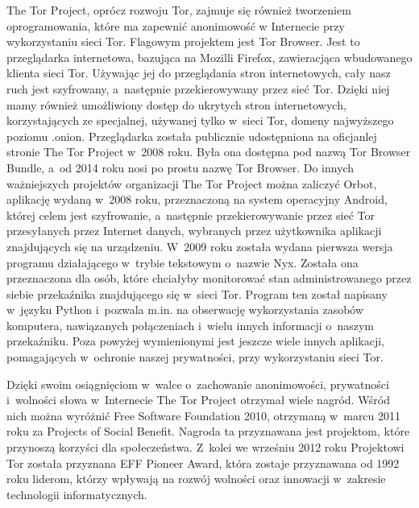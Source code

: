 The Tor Project, oprócz rozwoju Tor, zajmuje się również tworzeniem oprogramowania, które ma zapewnić anonimowość w Internecie przy wykorzystaniu sieci Tor. Flagowym projektem jest Tor Browser. Jest to przeglądarka internetowa, bazująca na Mozilli Firefox, zawieracjąca wbudowanego klienta sieci Tor. Używając jej do przeglądania stron internetowych, cały nasz ruch jest szyfrowany, a~następnie przekierowywany przez sieć Tor. Dzięki niej mamy również umożliwiony dostęp do ukrytych stron internetowych, korzystających ze specjalnej, używanej tylko w~sieci Tor, domeny najwyższego poziomu .onion\cite{torbrowser_design}. Przeglądarka została publicznie udostępniona na oficjanlej stronie The Tor Project w~2008 roku\cite{archive1}. Była ona dostępna pod nazwą Tor Browser Bundle, a~od 2014 roku nosi po prostu nazwę Tor Browser\cite{archive2}. Do innych ważniejszych projektów organizacji The Tor Project można zaliczyć Orbot, aplikację wydaną w~2008 roku, przeznaczoną na system operacyjny Android, której celem jest szyfrowanie, a~następnie przekierowywanie przez sieć Tor przesyłanych przez Internet danych, wybranych przez użytkownika aplikacji znajdujących się na urządzeniu\cite{orbot}. W~2009 roku została wydana pierwsza wersja programu działającego w~trybie tekstowym o~nazwie Nyx\cite{nyx_changelog}. Została ona przeznaczona dla osób, które chciałyby monitorować stan administrowanego przez siebie przekaźnika znajdującego się w~sieci Tor. Program ten został napisany w~języku Python i~pozwala m.in. na obserwację wykorzystania zasobów komputera, nawiązanych połączeniach i~wielu innych informacji o~naszym przekaźniku\cite{nyx}. Poza powyżej wymienionymi jest jeszcze wiele innych aplikacji, pomagających w~ochronie naszej prywatności, przy wykorzystaniu sieci Tor\cite{torproject_projects}.

Dzięki swoim osiągnięciom w~walce o~zachowanie anonimowości, prywatności i~wolności słowa w~Internecie The Tor Project otrzymał wiele nagród. Wśród nich można wyróżnić Free Software Foundation 2010, otrzymaną w~marcu 2011 roku za Projects of Social Benefit. Nagroda ta przyznawana jest projektom, które przynoszą korzyści dla społeczeństwa\cite{free_software_awards}. Z~kolei we wrześniu 2012 roku Projektowi Tor została przyznana EFF Pioneer Award, która zostaje przyznawana od 1992 roku liderom, którzy wpływają na rozwój wolności oraz innowacji w~zakresie technologii informatycznych\cite{eff_award}.